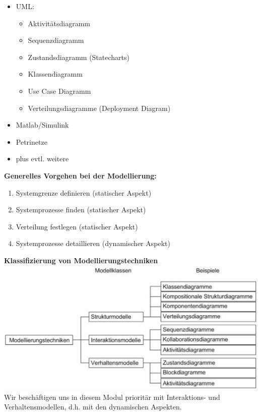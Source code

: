 \begin{multicols}{2}
	\begin{itemize}
		\item UML:
		      \begin{itemize}
			      \item Aktivitätsdiagramm
			      \item Sequenzdiagramm
			      \item Zustandsdiagramm (Statecharts)
			      \item Klassendiagramm
			      \item Use Case Diagramm
			      \item Verteilungsdiagramme (Deployment Diagram)
		      \end{itemize}
		\item Matlab/Simulink
		\item Petrinetze
		\item plus evtl. weitere
	\end{itemize}
	\vfill\null
	\columnbreak

	\textbf{Generelles Vorgehen bei der Modellierung:}
	\begin{enumerate}
		\item Systemgrenze definieren (statischer Aspekt)
		\item Systemprozesse finden (statischer Aspekt)
		\item Verteilung festlegen (statischer Aspekt)
		\item Systemprozesse detaillieren (dynamischer Aspekt)
	\end{enumerate}

	\textbf{Klassifizierung von Modellierungstechniken}\\
	\includegraphics[width=\linewidth]{./images/Modellierung/klassifizierungModellierungstechniken}
	Wir beschäftigen uns in diesem Modul prioritär mit Interaktions- und Verhaltensmodellen, d.h. mit den dynamischen Aspekten.
\end{multicols}


